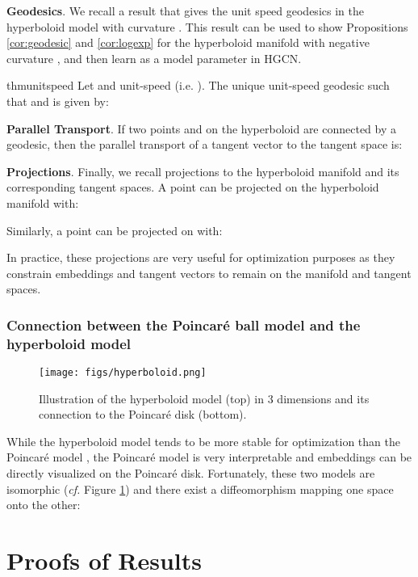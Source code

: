 \documentclass{article}
\newcommand{\xhdr}[1]{{\noindent\bfseries #1}.}
\newcommand{\name}{\textsc{HGCN}\xspace}
\begin{document}
\xhdr{Geodesics} 
We recall a result that gives the unit speed geodesics in the hyperboloid model with curvature  \cite{robbin2011introduction}.
This result can be used to show Propositions \ref{cor:geodesic} and \ref{cor:logexp} for the hyperboloid manifold with negative curvature , and then learn  as a model parameter in \name. 
\begin{restatable}[]{thm}{unitspeed}
\label{thm:unit_speed}
Let  and  unit-speed (i.e. ).
The unique unit-speed geodesic  such that  and  is given by:

\end{restatable}

\xhdr{Parallel Transport}
If two points  and  on the hyperboloid  are connected by a geodesic, then the parallel transport of a tangent vector  to the tangent space  is:


\xhdr{Projections}
Finally, we recall projections to the hyperboloid manifold and its corresponding tangent spaces. 
A point  can be projected on the hyperboloid manifold  with:

Similarly, a point  can be projected on  with:

In practice, these projections are very useful for optimization purposes as they constrain embeddings and tangent vectors to remain on the manifold and tangent spaces.

\subsubsection{Connection between the Poincar\'e ball model and the hyperboloid model}
\begin{figure}[t]
  \begin{center}
    \texttt{[image: figs/hyperboloid.png]}
  \end{center}
  \caption{Illustration of the hyperboloid model (top) in 3 dimensions and its connection to the Poincar\'e disk (bottom).}
  \label{fig:hyperboloid}
\end{figure}
While the hyperboloid model tends to be more stable for optimization than the Poincar\'e model \cite{nickel2018learning}, the Poincar\'e model is very interpretable and embeddings can be directly visualized on the Poincar\'e disk. 
Fortunately, these two models are isomorphic (\emph{cf.} Figure \ref{fig:hyperboloid}) and there exist a diffeomorphism  mapping one space onto the other:


\section{Proofs of Results}
\end{document}
